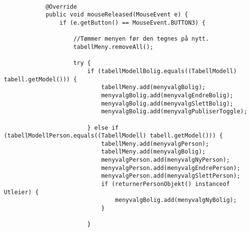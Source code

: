 \begin{lstlisting}[caption=Eksempel på hvilke menyvalg som dukker opp ved høyreklikk i tabellen]

            @Override
            public void mouseReleased(MouseEvent e) {
                if (e.getButton() == MouseEvent.BUTTON3) {

                    //Tømmer menyen før den tegnes på nytt.
                    tabellMeny.removeAll();

                    try {
                        if (tabellModellBolig.equals((TabellModell) tabell.getModel())) {
                            tabellMeny.add(menyvalgBolig);
                            menyvalgBolig.add(menyvalgEndreBolig);
                            menyvalgBolig.add(menyvalgSlettBolig);
                            menyvalgBolig.add(menyvalgPubliserToggle);

                        } else if (tabellModellPerson.equals((TabellModell) tabell.getModel())) {
                            tabellMeny.add(menyvalgPerson);
                            tabellMeny.add(menyvalgBolig);
                            menyvalgPerson.add(menyvalgNyPerson);
                            menyvalgPerson.add(menyvalgEndrePerson);
                            menyvalgPerson.add(menyvalgSlettPerson);
                            if (returnerPersonObjekt() instanceof Utleier) {
                                menyvalgBolig.add(menyvalgNyBolig);
                            }

                        }
\end{lstlisting} 


